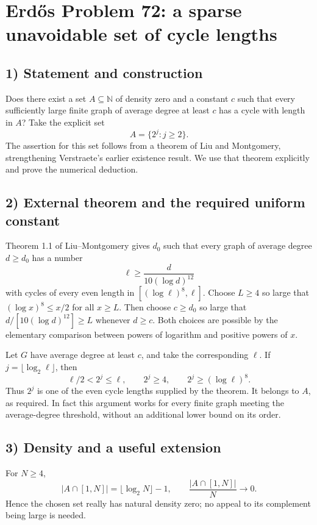 \section{Erd\H{o}s Problem 72: a sparse unavoidable set of cycle lengths}

\subsection{1) Statement and construction}
Does there exist a set $A\subseteq\mathbb N$ of density zero and a
constant $c$ such that every sufficiently large finite graph of
average degree at least $c$ has a cycle with length in $A$?
Take the explicit set
\[
 A=\{2^j:j\geq2\}.
\]
The assertion for this set follows from a theorem of Liu and
Montgomery, strengthening Verstraete's earlier existence result.
We use that theorem explicitly and prove the numerical deduction.

\subsection{2) External theorem and the required uniform constant}
Theorem 1.1 of Liu--Montgomery gives $d_0$ such that every graph
of average degree $d\geq d_0$ has a number
\[
 \ell\geq\frac{d}{10(\log d)^{12}}
\]
with cycles of every even length in $[(\log\ell)^8,\ell]$.
Choose $L\geq4$ so large that $(\log x)^8\leq x/2$ for all
$x\geq L$. Then choose $c\geq d_0$ so large that
$d/[10(\log d)^{12}]\geq L$ whenever $d\geq c$.
Both choices are possible by the elementary comparison between powers
of logarithm and positive powers of $x$.

Let $G$ have average degree at least $c$, and take the corresponding
$\ell$. If $j=\lfloor\log_2\ell\rfloor$, then
\[
 \ell/2<2^j\leq\ell,
 \qquad 2^j\geq4,
 \qquad 2^j\geq(\log\ell)^8.
\]
Thus $2^j$ is one of the even cycle lengths supplied by the theorem.
It belongs to $A$, as required. In fact this argument works for
every finite graph meeting the average-degree threshold, without
an additional lower bound on its order.

\subsection{3) Density and a useful extension}
For $N\geq4$,
\[
 |A\cap[1,N]|=\lfloor\log_2N\rfloor-1,
 \qquad \frac{|A\cap[1,N]|}{N}\longrightarrow0.
\]
Hence the chosen set really has natural density zero; no appeal to
its complement being large is needed.

